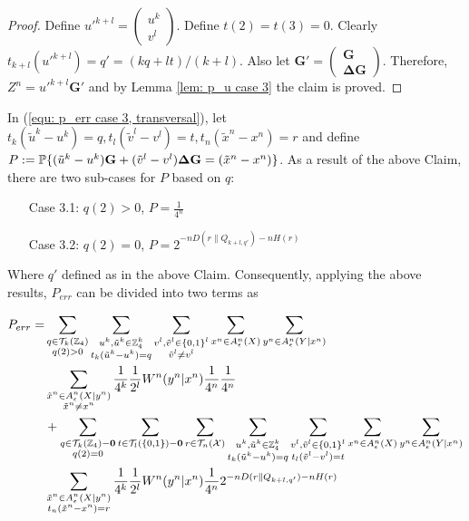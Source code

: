 \begin{proof}
Define $u'^{k+l}=\begin{pmatrix} u^k\\v^l \end{pmatrix}$. Define $t(2)=t(3)=0$. Clearly $t_{k+l}(u'^{k+l})=q'=(kq+lt)/(k+l)$. Also let $\mathbf{G}'=\begin{pmatrix} \mathbf{G}\\ \mathbf{\Delta G}\end{pmatrix}$. Therefore,  $Z^n=u'^{k+l}\mathbf{G}'$ and by Lemma \ref{lem: p_u case 3} the claim is proved.
\end{proof}

In (\ref{equ: p_err case 3, transversal}), let $t_k(\tilde{u}^k -u^k)=q, t_l(\tilde{v}^l- v^l)=t, t_n(\tilde{x}^n- x^n)=r$ and define $P:=\mathbb{P}\{ (\tilde{u}^k-u^k)\mathbf{G}+(\tilde{v}^l-v^l)\mathbf{\Delta G}=(\tilde{x}^n-x^n)\}$.  As a result of the above Claim, there are two sub-cases for $P$ based on $q$:
 
\begin{itemize}
\item[Case 3.1:] $q(2)>0$,  $P=\frac{1}{4^n}$
\item[Case 3.2:] $q(2)=0$, $P=2^{-nD(r\| Q_{k+l,q'})-nH(r)}$ 
\end{itemize} 
Where $q'$ defined as in the above Claim. 
Consequently, applying the above results, $P_{err}$ can be divided into two terms as


\begin{align}\label{equ: p_err, case 3 trans, part 1}
P_{err}=&\sum_{\substack{q\in \mathcal{T}_k(\ZZ_4)\\q(2)>0}} \sum_{\substack{u^k, \tilde{u}^k \in \ZZ_4^k\\ t_k(\tilde{u}^k -u^k)=q}} \sum_{\substack{v^l, \tilde{v}^l \in \{0, 1\}^l\\ \tilde{v}^l \neq v^l}}   \sum_{x^n\in A_\epsilon^n(X)} \sum_{y^n\in A_\epsilon^n(Y|x^n)}\\\nonumber
&\sum_{\substack{\tilde{x}^n\in A_\epsilon^n(X|y^n) \\ \tilde{x}^n\neq x^n}}  \frac{1}{4^k} \frac{1}{2^l} W^n(y^n|x^n) \frac{1}{4^n}\frac{1}{4^n}\\
%
%
\label{equ: p_err, case 3 trans, part 2}
&+\sum_{\substack{q\in \mathcal{T}_k(\ZZ_4)-\mathbf{0}\\q(2)=0}}\sum_{t\in \mathcal{T}_l(\{0,1 \})-\mathbf{0}}\sum_{r \in \mathcal{T}_n(\mathcal{X}) } \sum_{\substack{u^k, \tilde{u}^k \in \ZZ_4^k\\ t_k(\tilde{u}^k -u^k)=q}} \sum_{\substack{v^l, \tilde{v}^l \in \{0, 1\}^l\\ t_l(\tilde{v}^l- v^l)=t}}  \sum_{x^n\in A_\epsilon^n(X)} \sum_{y^n\in A_\epsilon^n(Y|x^n)}\\\nonumber
&\sum_{\substack{\tilde{x}^n\in A_\epsilon^n(X|y^n)\\ t_n(\tilde{x}^n- x^n)=r}}  \frac{1}{4^k} \frac{1}{2^l} W^n(y^n|x^n) \frac{1}{4^n}2^{-nD(r\| Q_{k+l,q'})-nH(r)}
\end{align}

